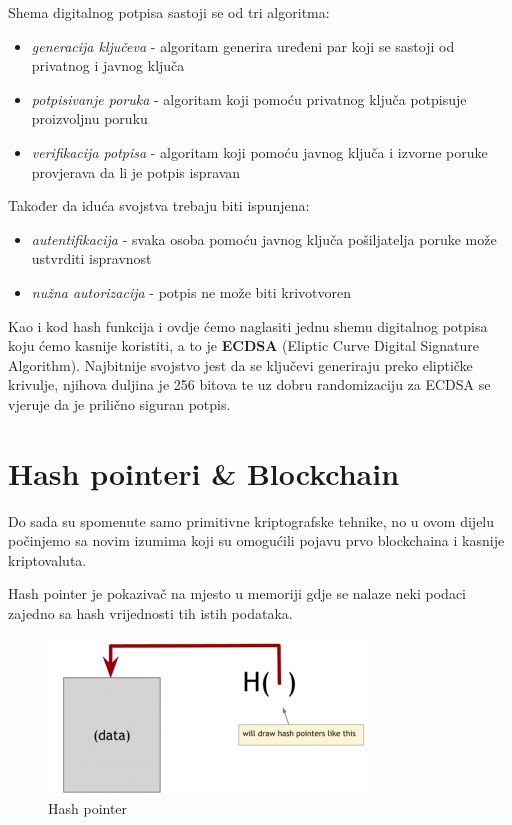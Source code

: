 \documentclass[a4paper,oneside,12pt]{memoir} %
\begin{document}
\begin{definicija}
Shema digitalnog potpisa sastoji se od tri algoritma: 
\begin{itemize}
    \item \textit{generacija ključeva} - algoritam generira uređeni par koji se sastoji od privatnog i javnog ključa
    \item \textit{potpisivanje poruka} - algoritam koji pomoću privatnog ključa potpisuje proizvoljnu poruku
    \item \textit{verifikacija potpisa} - algoritam koji pomoću javnog ključa i izvorne poruke provjerava da li je potpis ispravan
\end{itemize}
Također da iduća svojstva trebaju biti ispunjena:
\begin{itemize}
    \item \textit{autentifikacija} - svaka osoba pomoću javnog ključa pošiljatelja poruke može ustvrditi ispravnost
    \item \textit{nužna autorizacija} - potpis ne može biti krivotvoren
\end{itemize}
\end{definicija}

Kao i kod hash funkcija i ovdje ćemo naglasiti jednu shemu digitalnog potpisa koju ćemo kasnije koristiti, a to je \textbf{ECDSA} (Eliptic Curve Digital Signature Algorithm). Najbitnije svojstvo jest da se ključevi generiraju preko eliptičke krivulje, njihova duljina je 256 bitova te uz dobru randomizaciju za ECDSA se vjeruje da je prilično siguran potpis.

\section{Hash pointeri \& Blockchain}

Do sada su spomenute samo primitivne kriptografske tehnike, no u ovom dijelu počinjemo sa novim izumima koji su omogućili pojavu prvo blockchaina i kasnije kriptovaluta. 

\begin{definicija}
Hash pointer je pokazivač na mjesto u memoriji gdje se nalaze neki podaci zajedno sa hash vrijednosti tih istih podataka.
\end{definicija}

\begin{figure}[h]
\centering
\includegraphics[scale=0.8]{hash_pointer}
\caption{Hash pointer}
\end{figure}
\end{document}
